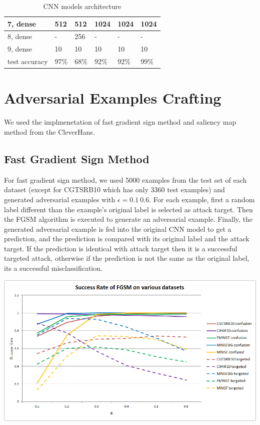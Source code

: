 \documentclass{article}
\begin{document}
\begin{table}
\begin{tabular}{llllll}
    7, dense &
        512 &
        512 &
        1024 &
        1024 &
        1024 \\
    \midrule

    8, dense &
        - &
        256 &
        - &
        - &
        - \\
    \midrule

    9, dense &
        10 &
        10 &
        10 &
        10 &
        10 \\

    \midrule

    test accuracy &
        97\% &
        68\% &
        92\% &
        92\% &
        99\% \\

    \bottomrule
\end{tabular}
\caption{\label{tab:cnnarch} CNN models architecture}
\end{table}


\section{Adversarial Examples Crafting}

We used the implmenetation of fast gradient sign method and saliency map method from the CleverHans\cite{cleverhans}.

\subsection{Fast Gradient Sign Method}

For fast gradient sign method, we used 5000 examples from the test set of each dataset (except for CGTSRB10 which has only 3360 test examples)
and generated adversarial examples with \(\epsilon=0.1~0.6\).
For each example, first a random label different than the example's original label is selected as attack target.
Then the FGSM algorithm is executed to generate an adversarial example.
Finally, the generated adversarial example is fed into the original CNN model to get a prediction,
and the prediction is compared with its original label and the attack target.
If the prediction is identical with attack target then it is a successful targeted attack,
otherwise if the prediction is not the same as the original label, its a successful misclassification.


\includegraphics[scale=0.45]{fgsm}
\end{document}
